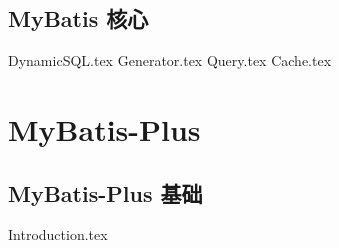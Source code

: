 \documentclass{PionpillNote-book}
\begin{document}
\chapter{MyBatis 核心}
{DynamicSQL.tex}
{Generator.tex}
{Query.tex}
{Cache.tex}

\part{MyBatis-Plus}

\chapter{MyBatis-Plus 基础}
{Introduction.tex}
\end{document}
